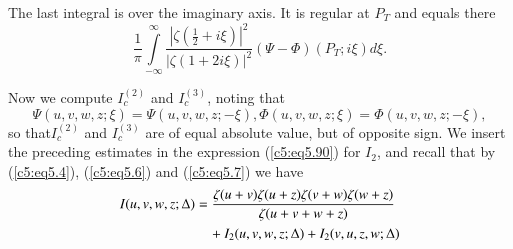 The last integral is over the imaginary axis. It is regular at $P_T$
and equals there 
$$
\frac{1}{\pi} \int\limits^\infty_{-\infty} \frac{|\zeta(\frac{1}{2} +
  i\xi)|^2}{|\zeta(1+2i\xi)|^2} (\Psi - \Phi) (P_T; i\xi) d \xi. 
$$

Now we compute $I^{(2)}_c$ and $I^{(3)}_c$, noting that 
$$
\Psi (u,v,w,z;\xi) = \Psi (u,v,w,z;-\xi) , \Phi (u,v,w,z;\xi) = \Phi
(u, v, w, z ; -\xi),  
 $$
so that\pageoriginale $I^{(2)}_c$ and $I^{(3)}_c$ are of equal
absolute value, but of opposite sign. We insert the preceding
estimates in the expression (\ref{c5:eq5.90}) for $I_2$, and recall
that by (\ref{c5:eq5.4}), (\ref{c5:eq5.6}) and (\ref{c5:eq5.7}) we
have 
\begin{align}
I(u,v,w,z;\Delta) &= \frac{\zeta(u+v) \zeta(u+z) \zeta (v+w)
  \zeta(w+z)}{ \zeta(u+v+w+z)}  \label{c5:eq5.108}\\
&\quad+ I_2 (u,v,w,z;\Delta) + I_2 (v, u,z,w;\Delta)\notag
\end{align}

